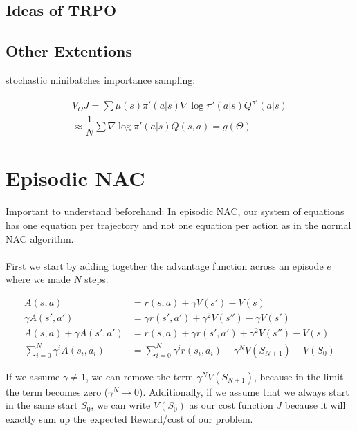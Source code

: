 \subsection{Ideas of TRPO}




\subsection{Other Extentions}

\begin{itemize}
	\x stochastic
	\x minibatches
	\x importance sampling:
\end{itemize}

\begin{align}
	V_{\Theta} J = \sum \mu(s) \pi'(a|s) \nabla \log \pi'(a|s) Q^{\pi'}(a|s) \\
	\approx \dfrac{1}{N} \sum \nabla \log \pi'(a|s) Q(s,a) = g(\Theta)
\end{align}





\section{Episodic NAC}
Important to understand beforehand: In episodic NAC, our system of equations has one equation per trajectory and not one equation per action as in the normal NAC algorithm.
\\\\
First we start by adding together the advantage function across an episode $e$ where we made $N$ steps.

\begin{align}
	A(s,a) &= r(s,a) + \gamma V(s') - V(s) \\
	\gamma A(s',a') &= \gamma r(s', a') + \gamma^2V(s'') - \gamma V(s') \\
	A(s, a) + \gamma A(s', a') &= r(s,a) + \gamma r(s',a') + \gamma^2 V(s'') - V(s) \\
	\sum_{i = 0}^{N}\gamma^i A(s_i, a_i) &= \sum_{i = 0}^{N}\gamma^i r(s_i, a_i) + \gamma^N V(S_{N+1}) - V(S_0)
\end{align}

\noindent If we assume $\gamma \neq 1$, we can remove the term $\gamma^N V(S_{N+1})$, because in the limit the term becomes zero ($\gamma^N \rightarrow 0$). Additionally, if we assume that we always start in the same start $S_0$, we can write $V(S_0)$ as our cost function $J$ because it will exactly sum up the expected Reward/cost of our problem.

